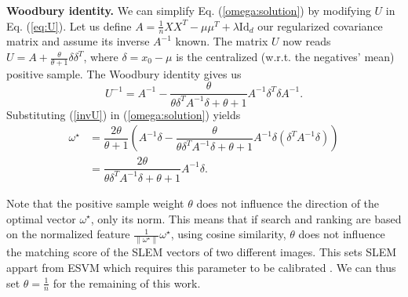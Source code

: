 \textbf{Woodbury identity.} 
We can simplify Eq. (\ref{omega:solution}) by modifying $U$ in Eq. (\ref{eq:U}).
Let us define $A = \frac{1}{n}XX^T-\mu\mu^T +\lambda\mathrm{Id}_d$ our regularized covariance matrix and assume its inverse $A^{-1}$ known. 
The matrix $U$ now reads $U = A + \frac{\theta}{\theta+1}\delta\delta^T$, where $\delta=x_0-\mu$ is the centralized (w.r.t. the negatives' mean) positive sample. The Woodbury identity \cite{woodbury} gives us
\begin{equation}
U^{-1} = A^{-1} -\dfrac{\theta}{\theta\delta^TA^{-1}\delta+ \theta+1}A^{-1}\delta^T\delta A^{-1}. \label{invU}
\end{equation}
Substituting (\ref{invU}) in (\ref{omega:solution}) yields
\begin{equation}
\begin{split}
\omega^\star &= \dfrac{2\theta}{\theta +1}\left(A^{-1}\delta - \dfrac{\theta}{\theta\delta^TA^{-1}\delta+ \theta+1} A^{-1}\delta (\delta^TA^{-1}\delta)\right)\\
&= \dfrac{2\theta}{\theta\delta^TA^{-1}\delta+ \theta+1} A^{-1}\delta.\label{Wood:omega}
\end{split}
\end{equation}

Note that the positive sample weight $\theta$ does not influence the direction of the optimal vector $\omega^\star$, only its norm. This means that if search and ranking are based on the normalized feature $\frac{1}{\|\omega^\star\|}\omega^\star$, \eg using cosine similarity, $\theta$ does not influence the matching score of the SLEM vectors of two different images. This sets SLEM appart from ESVM which requires this parameter to be calibrated \cite{Efros11,ZePe15}. We can thus set $\theta=\frac{1}{n}$ for the remaining of this work.


